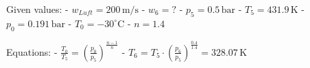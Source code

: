 Given values:  
- \( w_{Luft} = 200 \, \text{m/s} \)  
- \( w_6 = ? \)  
- \( p_5 = 0.5 \, \text{bar} \)  
- \( T_5 = 431.9 \, \text{K} \)  
- \( p_0 = 0.191 \, \text{bar} \)  
- \( T_0 = -30^\circ \text{C} \)  
- \( n = 1.4 \)  

Equations:  
- \( \frac{T_0}{T_5} = \left( \frac{p_0}{p_5} \right)^{\frac{n-1}{n}} \)  
- \( T_6 = T_5 \cdot \left( \frac{p_6}{p_5} \right)^{\frac{0.4}{1.4}} = 328.07 \, \text{K} \)